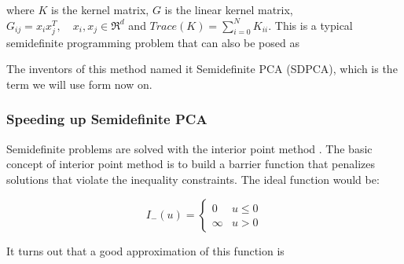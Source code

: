 \documentclass[12pt,letterpaper,doublespaced,ETD,dvips,proposal]{gtthesis}
\begin{document}
\begin{Body}
where $K$ is the kernel matrix, $G$ is the linear kernel matrix,
$G_{ij}=x_i x_j^T,\quad x_i,x_j\in \Re^d$ and
$Trace(K)=\sum_{i=0}^{N}K_{ii}$.
This is a typical semidefinite programming problem that can also be
posed as
\vspace{1cm}


\vspace{1cm}
The inventors of this method named it Semidefinite PCA (SDPCA),
which is the term we will use form now on.

\subsubsection{Speeding up Semidefinite PCA}
Semidefinite problems are solved with the interior point method  \cite{nesterov1994ipp}. The
basic concept of interior point method is to build a barrier
function that penalizes solutions that violate the inequality
constraints. The ideal function would be:

\begin{equation}
I_{-}(u)= \left\{
               \begin{array}{cc}
                 0    & u\leq 0 \\
                 \infty & u>0
                \end{array}
          \right.
\end{equation}


It turns out that a good approximation of this function is


\end{Body}
\end{document}
